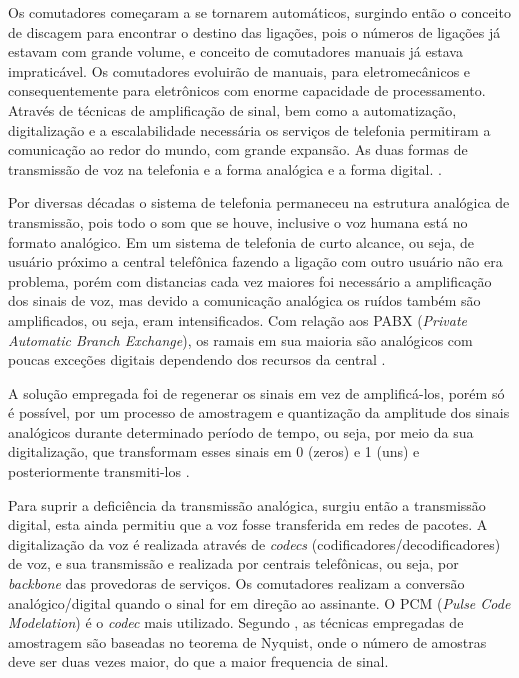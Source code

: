 Os comutadores começaram a se tornarem automáticos, surgindo então o conceito de discagem para encontrar o destino das ligações, pois o números de ligações já estavam com grande volume, e conceito de comutadores manuais já estava impraticável. Os comutadores evoluirão de manuais, para eletromecânicos e consequentemente para eletrônicos com enorme capacidade de processamento. Através de técnicas de amplificação de sinal, bem como a automatização, digitalização e a escalabilidade necessária os serviços de telefonia permitiram a comunicação ao redor do mundo, com grande expansão. As duas formas de transmissão de voz na telefonia e a forma analógica e a forma digital. \cite{books/daglib/0018909}.

Por diversas décadas o sistema de telefonia permaneceu na estrutura analógica de transmissão, pois todo o som que se houve, inclusive o voz humana está no formato analógico. Em um sistema de telefonia de curto alcance, ou seja, de usuário próximo a central telefônica fazendo a ligação com outro usuário não era problema, porém com distancias cada vez maiores foi necessário a amplificação dos sinais de voz, mas devido a comunicação analógica os ruídos também são amplificados, ou seja, eram intensificados. Com relação aos PABX (\textit{Private Automatic Branch Exchange}), os ramais em sua maioria são analógicos com poucas exceções digitais dependendo dos recursos da central \cite{books/daglib/0018909}.

A solução empregada foi de regenerar os sinais em vez de amplificá-los, porém só é possível, por um processo de amostragem e quantização da amplitude dos sinais analógicos durante determinado período de tempo, ou seja,  por meio da sua digitalização, que transformam esses sinais em 0 (zeros) e 1 (uns) e posteriormente transmiti-los \cite{alexandrekeller2014}.

Para suprir a deficiência da transmissão analógica, surgiu então a transmissão digital, esta ainda permitiu que a voz fosse transferida em redes de pacotes. A digitalização da voz é realizada através de \textit{codecs} (codificadores/decodificadores) de voz, e sua transmissão e realizada por centrais telefônicas, ou seja, por \textit{backbone} das provedoras de serviços. Os comutadores realizam a conversão analógico/digital quando o sinal for em direção ao assinante. O PCM (\textit{Pulse Code Modelation}) é o \textit{codec} mais utilizado. Segundo , as técnicas empregadas de amostragem são baseadas no teorema de Nyquist, onde o número de amostras deve ser duas vezes maior, do que a maior frequencia de sinal.

